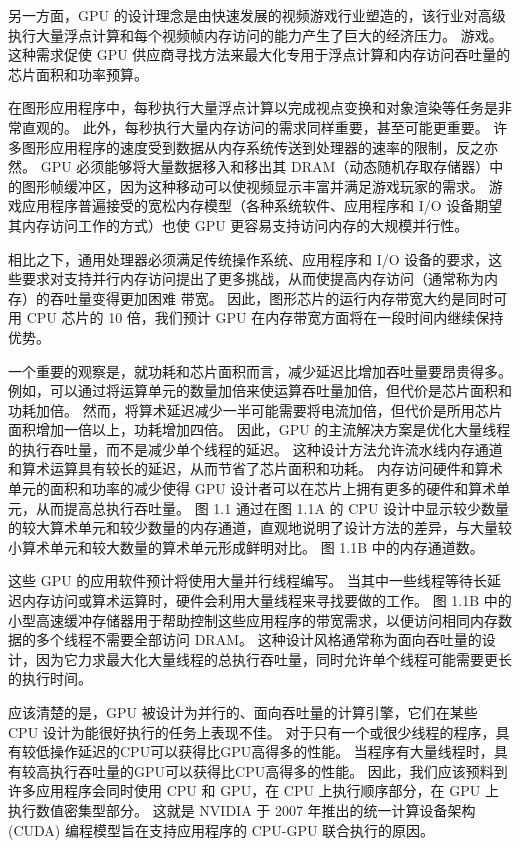 另一方面，GPU 的设计理念是由快速发展的视频游戏行业塑造的，该行业对高级执行大量浮点计算和每个视频帧内存访问的能力产生了巨大的经济压力。 游戏。 这种需求促使 GPU 供应商寻找方法来最大化专用于浮点计算和内存访问吞吐量的芯片面积和功率预算。

在图形应用程序中，每秒执行大量浮点计算以完成视点变换和对象渲染等任务是非常直观的。 此外，每秒执行大量内存访问的需求同样重要，甚至可能更重要。 许多图形应用程序的速度受到数据从内存系统传送到处理器的速率的限制，反之亦然。 GPU 必须能够将大量数据移入和移出其 DRAM（动态随机存取存储器）中的图形帧缓冲区，因为这种移动可以使视频显示丰富并满足游戏玩家的需求。 游戏应用程序普遍接受的宽松内存模型（各种系统软件、应用程序和 I/O 设备期望其内存访问工作的方式）也使 GPU 更容易支持访问内存的大规模并行性。

相比之下，通用处理器必须满足传统操作系统、应用程序和 I/O 设备的要求，这些要求对支持并行内存访问提出了更多挑战，从而使提高内存访问（通常称为内存）的吞吐量变得更加困难 带宽。 因此，图形芯片的运行内存带宽大约是同时可用 CPU 芯片的 10 倍，我们预计 GPU 在内存带宽方面将在一段时间内继续保持优势。

一个重要的观察是，就功耗和芯片面积而言，减少延迟比增加吞吐量要昂贵得多。 例如，可以通过将运算单元的数量加倍来使运算吞吐量加倍，但代价是芯片面积和功耗加倍。 然而，将算术延迟减少一半可能需要将电流加倍，但代价是所用芯片面积增加一倍以上，功耗增加四倍。 因此，GPU 的主流解决方案是优化大量线程的执行吞吐量，而不是减少单个线程的延迟。 这种设计方法允许流水线内存通道和算术运算具有较长的延迟，从而节省了芯片面积和功耗。 内存访问硬件和算术单元的面积和功率的减少使得 GPU 设计者可以在芯片上拥有更多的硬件和算术单元，从而提高总执行吞吐量。 图 1.1 通过在图 1.1A 的 CPU 设计中显示较少数量的较大算术单元和较少数量的内存通道，直观地说明了设计方法的差异，与大量较小算术单元和较大数量的算术单元形成鲜明对比。 图 1.1B 中的内存通道数。

这些 GPU 的应用软件预计将使用大量并行线程编写。 当其中一些线程等待长延迟内存访问或算术运算时，硬件会利用大量线程来寻找要做的工作。 图 1.1B 中的小型高速缓冲存储器用于帮助控制这些应用程序的带宽需求，以便访问相同内存数据的多个线程不需要全部访问 DRAM。 这种设计风格通常称为面向吞吐量的设计，因为它力求最大化大量线程的总执行吞吐量，同时允许单个线程可能需要更长的执行时间。

应该清楚的是，GPU 被设计为并行的、面向吞吐量的计算引擎，它们在某些 CPU 设计为能很好执行的任务上表现不佳。 对于只有一个或很少线程的程序，具有较低操作延迟的CPU可以获得比GPU高得多的性能。 当程序有大量线程时，具有较高执行吞吐量的GPU可以获得比CPU高得多的性能。 因此，我们应该预料到许多应用程序会同时使用 CPU 和 GPU，在 CPU 上执行顺序部分，在 GPU 上执行数值密集型部分。 这就是 NVIDIA 于 2007 年推出的统一计算设备架构 (CUDA) 编程模型旨在支持应用程序的 CPU-GPU 联合执行的原因。

